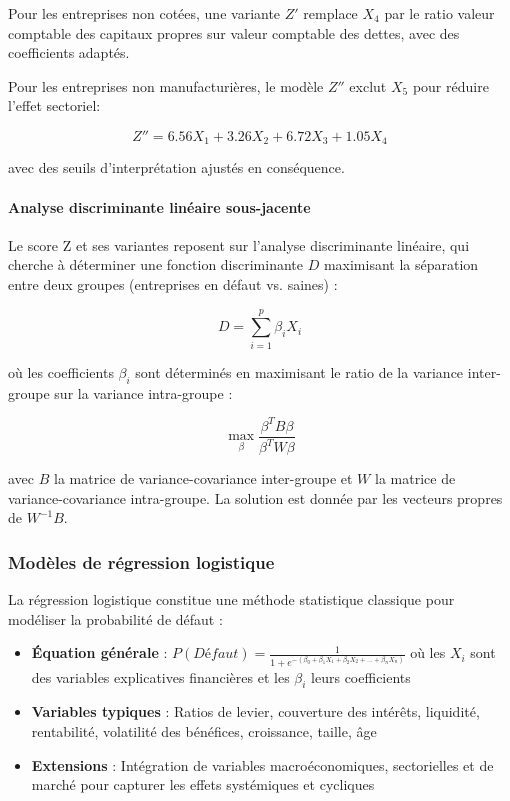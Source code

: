 Pour les entreprises non cotées, une variante $Z'$ remplace $X_4$ par le ratio valeur comptable des capitaux propres sur valeur comptable des dettes, avec des coefficients adaptés.

Pour les entreprises non manufacturières, le modèle $Z''$ exclut $X_5$ pour réduire l'effet sectoriel:

\begin{equation}
Z'' = 6.56 X_1 + 3.26 X_2 + 6.72 X_3 + 1.05 X_4
\end{equation}

avec des seuils d'interprétation ajustés en conséquence.

\paragraph{Analyse discriminante linéaire sous-jacente}
Le score Z et ses variantes reposent sur l'analyse discriminante linéaire, qui cherche à déterminer une fonction discriminante $D$ maximisant la séparation entre deux groupes (entreprises en défaut vs. saines) :

\begin{equation}
D = \sum_{i=1}^{p} \beta_i X_i
\end{equation}

où les coefficients $\beta_i$ sont déterminés en maximisant le ratio de la variance inter-groupe sur la variance intra-groupe :

\begin{equation}
\max_{\beta} \frac{\beta^T B \beta}{\beta^T W \beta}
\end{equation}

avec $B$ la matrice de variance-covariance inter-groupe et $W$ la matrice de variance-covariance intra-groupe. La solution est donnée par les vecteurs propres de $W^{-1}B$.

\subsubsection{Modèles de régression logistique}

La régression logistique constitue une méthode statistique classique pour modéliser la probabilité de défaut :

\begin{itemize}
    \item \textbf{Équation générale} : $P(Défaut) = \frac{1}{1 + e^{-(\beta_0 + \beta_1 X_1 + \beta_2 X_2 + ... + \beta_n X_n)}}$ où les $X_i$ sont des variables explicatives financières et les $\beta_i$ leurs coefficients
    
    \item \textbf{Variables typiques} : Ratios de levier, couverture des intérêts, liquidité, rentabilité, volatilité des bénéfices, croissance, taille, âge
    
    \item \textbf{Extensions} : Intégration de variables macroéconomiques, sectorielles et de marché pour capturer les effets systémiques et cycliques
\end{itemize}

